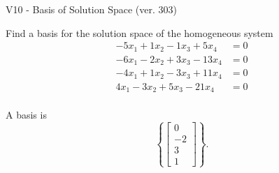 \begin{exercise}
  \begin{exerciseTitle}V10 - Basis of Solution Space (ver. 303)\end{exerciseTitle}
  \begin{exerciseStatement}
    Find a basis for the solution space of the homogeneous system 
\begin{align*}
 -5 x_ 1 + 1 x_ 2 -1 x_ 3 + 5 x_ 4 &= 0  \\ 
  -6 x_ 1 -2 x_ 2 + 3 x_ 3 -13 x_ 4 &= 0  \\ 
  -4 x_ 1 + 1 x_ 2 -3 x_ 3 + 11 x_ 4 &= 0  \\ 
  4 x_ 1 -3 x_ 2 + 5 x_ 3 -21 x_ 4 &= 0  \\ 
 \end{align*}


 
  \end{exerciseStatement}

  \begin{exerciseAnswer}
   A basis is   
\[\left\{\left[\begin{array}{c}
0 \\
-2 \\
3 \\
1
\end{array}\right]\right\}.\]

  


  \end{exerciseAnswer}
\end{exercise}